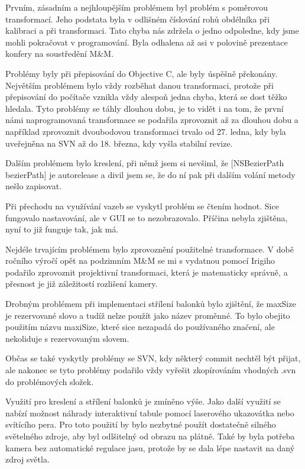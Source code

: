 \documentclass[twoside,12pt]{article}
\begin{document}
Prvním, zásadním a nejhloupějším problémem byl problém s poměrovou transformací. Jeho podstata byla v odlišném číslování rohů obdélníka při kalibraci a při transformaci. Tato chyba nás zdržela o jedno odpoledne, kdy jsme mohli pokračovat v programování. Byla odhalena až asi v polovině prezentace konfery na soustředění M\&M. 

Problémy byly při přepisování do Objective C, ale byly úspěšně překonány. Největším problémem bylo vždy rozběhat danou transformaci, protože při přepisování do počítače vznikla vždy alespoň jedna chyba, která se dost těžko hledala. Tyto problémy se táhly dlouhou dobu, je to vidět i na tom, že první námi naprogramovaná transformace se podařila zprovoznit až za dlouhou dobu a například zprovoznit dvoubodovou transformaci trvalo od 27. ledna, kdy byla uveřejněna na SVN až do 18. března, kdy vyšla stabilní revize.

Dalším problémem bylo kreslení, při němž jsem si nevšiml, že [NSBezierPath bezierPath] je autorelease a divil jsem se, že do ní pak při dalším volání metody nešlo zapisovat.

Při přechodu na využívání vazeb se vyskytl problém se čtením hodnot. Sice fungovalo nastavování, ale v GUI se to nezobrazovalo. Příčina nebyla zjištěna, nyní to již funguje tak, jak má.

Nejdéle trvajícím problémem bylo zprovoznění použitelné transformace. V době ročního výročí opět na podzimním M\&M se mi s vydatnou pomocí Irigiho podařilo zprovoznit projektivní transformaci, která je matematicky správně, a přesnost je již záležitostí rozlišení kamery. 

Drobným problémem při implementaci střílení balonků bylo zjištění, že maxSize je rezervované slovo a tudíž nelze použít jako název proměnné. To bylo obejito použitím názvu maxiSize, které sice nezapadá do používaného značení, ale nekoliduje s rezervovaným slovem.

Občas se také vyskytly problémy se SVN, kdy některý commit nechtěl být přijat, ale nakonec se tyto problémy podařilo vždy vyřešit zkopírováním vhodných .svn do problémových složek.

Využití pro kreslení a střílení balonků je zmíněno výše. Jako další využití se nabízí možnost náhrady interaktivní tabule pomocí laserového ukazovátka nebo svítícího pera. Pro toto použití by bylo nezbytné použít dostatečně silného světelného zdroje, aby byl odlšitelný od obrazu na plátně. Také by byla potřeba kamera bez automatické regulace jasu, protože by se dala lépe nastavit na daný zdroj světla. 
\end{document}

